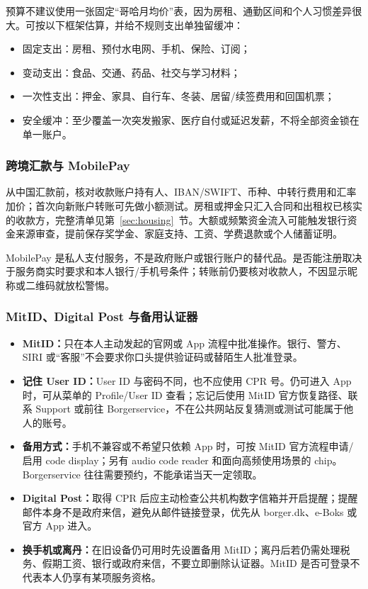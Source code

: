 预算不建议使用一张固定“哥哈月均价”表，因为房租、通勤区间和个人习惯差异很大。可按以下框架估算，并给不规则支出单独留缓冲：

\begin{itemize}[leftmargin=2em,itemsep=2pt]
  \item 固定支出：房租、预付水电网、手机、保险、订阅；
  \item 变动支出：食品、交通、药品、社交与学习材料；
  \item 一次性支出：押金、家具、自行车、冬装、居留/续签费用和回国机票；
  \item 安全缓冲：至少覆盖一次突发搬家、医疗自付或延迟发薪，不将全部资金锁在单一账户。
\end{itemize}

\subsubsection{跨境汇款与 MobilePay}

从中国汇款前，核对收款账户持有人、IBAN/SWIFT、币种、中转行费用和汇率加价；首次向新账户转账可先做小额测试。房租或押金只汇入合同和出租权已核实的收款方，完整清单见第~\ref{sec:housing}~节。大额或频繁资金流入可能触发银行资金来源审查，提前保存奖学金、家庭支持、工资、学费退款或个人储蓄证明。

MobilePay 是私人支付服务，不是政府账户或银行账户的替代品。是否能注册取决于服务商实时要求和本人银行/手机号条件；转账前仍要核对收款人，不因显示昵称或二维码就放松警惕。

\subsubsection{MitID、Digital Post 与备用认证器}

\begin{itemize}[leftmargin=2em,itemsep=3pt]
  \item \textbf{MitID：}只在本人主动发起的官网或 App 流程中批准操作。银行、警方、SIRI 或“客服”不会要求你口头提供验证码或替陌生人批准登录。
  \item \textbf{记住 User ID：}User ID 与密码不同，也不应使用 CPR 号。仍可进入 App 时，可从菜单的 Profile/User ID 查看；忘记后使用 MitID 官方恢复路径、联系 Support 或前往 Borgerservice，不在公共网站反复猜测或测试可能属于他人的账号。
  \item \textbf{备用方式：}手机不兼容或不希望只依赖 App 时，可按 MitID 官方流程申请/启用 code display；另有 audio code reader 和面向高频使用场景的 chip。Borgerservice 往往需要预约，不能承诺当天一定领取。
  \item \textbf{Digital Post：}取得 CPR 后应主动检查公共机构数字信箱并开启提醒；提醒邮件本身不是政府来信，避免从邮件链接登录，优先从 borger.dk、e-Boks 或官方 App 进入。
  \item \textbf{换手机或离丹：}在旧设备仍可用时先设置备用 MitID；离丹后若仍需处理税务、假期工资、银行或政府来信，不要立即删除认证器。MitID 是否可登录不代表本人仍享有某项服务资格。
\end{itemize}

